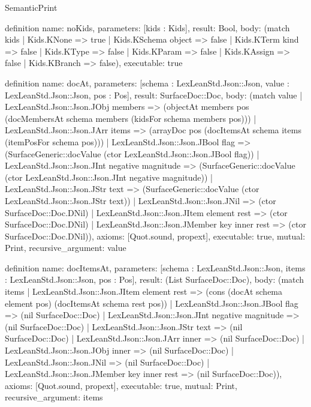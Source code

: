 \begin{lexlean}{SemanticPrint}
\begin{semanticmodule}
definition{
  name: noKids,
  parameters: [kids : Kids],
  result: Bool,
  body: (match kids
    | Kids.KNone => true
    | Kids.KSchema object => false
    | Kids.KTerm kind => false
    | Kids.KType => false
    | Kids.KParam => false
    | Kids.KAssign => false
    | Kids.KBranch => false),
  executable: true
}

definition{
  name: docAt,
  parameters: [schema : LexLeanStd.Json::Json, value : LexLeanStd.Json::Json, pos : Pos],
  result: SurfaceDoc::Doc,
  body: (match value
    | LexLeanStd.Json::Json.JObj members => (objectAt members pos (docMembersAt schema members (kidsFor schema members pos)))
    | LexLeanStd.Json::Json.JArr items => (arrayDoc pos (docItemsAt schema items (itemPosFor schema pos)))
    | LexLeanStd.Json::Json.JBool flag => (SurfaceGeneric::docValue (ctor LexLeanStd.Json::Json.JBool flag))
    | LexLeanStd.Json::Json.JInt negative magnitude => (SurfaceGeneric::docValue (ctor LexLeanStd.Json::Json.JInt negative magnitude))
    | LexLeanStd.Json::Json.JStr text => (SurfaceGeneric::docValue (ctor LexLeanStd.Json::Json.JStr text))
    | LexLeanStd.Json::Json.JNil => (ctor SurfaceDoc::Doc.DNil)
    | LexLeanStd.Json::Json.JItem element rest => (ctor SurfaceDoc::Doc.DNil)
    | LexLeanStd.Json::Json.JMember key inner rest => (ctor SurfaceDoc::Doc.DNil)),
  axioms: [Quot.sound, propext],
  executable: true,
  mutual: Print,
  recursive_argument: value
}

definition{
  name: docItemsAt,
  parameters: [schema : LexLeanStd.Json::Json, items : LexLeanStd.Json::Json, pos : Pos],
  result: (List SurfaceDoc::Doc),
  body: (match items
    | LexLeanStd.Json::Json.JItem element rest => (cons (docAt schema element pos) (docItemsAt schema rest pos))
    | LexLeanStd.Json::Json.JBool flag => (nil SurfaceDoc::Doc)
    | LexLeanStd.Json::Json.JInt negative magnitude => (nil SurfaceDoc::Doc)
    | LexLeanStd.Json::Json.JStr text => (nil SurfaceDoc::Doc)
    | LexLeanStd.Json::Json.JArr inner => (nil SurfaceDoc::Doc)
    | LexLeanStd.Json::Json.JObj inner => (nil SurfaceDoc::Doc)
    | LexLeanStd.Json::Json.JNil => (nil SurfaceDoc::Doc)
    | LexLeanStd.Json::Json.JMember key inner rest => (nil SurfaceDoc::Doc)),
  axioms: [Quot.sound, propext],
  executable: true,
  mutual: Print,
  recursive_argument: items
}


\end{semanticmodule}
\end{lexlean}

